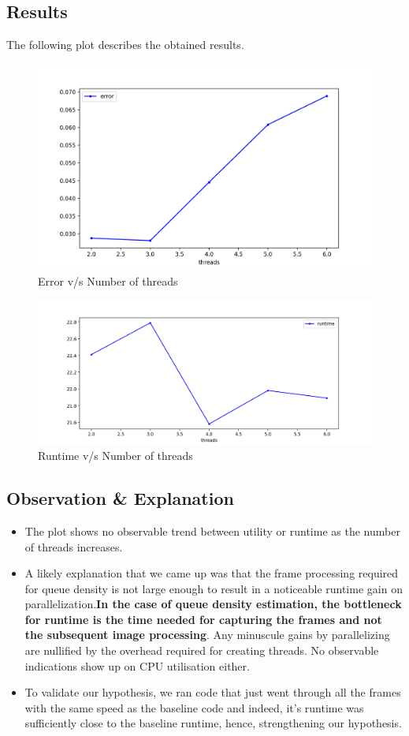 \documentclass[a4paper]{article}
\begin{document}
\subsection*{Results}
The following plot describes the obtained results.
\begin{figure}[h!]
    \centering
    \includegraphics[width=0.5\linewidth]{spatial-thread-error.png}
    \caption{Error v/s Number of threads}
    \label{fig:spatial-thread-error.png}
\end{figure}
\begin{figure}[H]
    \centering
    \includegraphics[width=0.5\linewidth]{spatial-thread-runtime.png}
    \caption{Runtime v/s Number of threads}
    \label{fig:spatial-thread-runtime.png}
\end{figure}
\subsection*{Observation \& Explanation}
\begin{itemize}
    \item The plot shows no observable trend between utility or runtime as the number of threads increases. \item A likely explanation that we came up was that the frame processing required for queue density is not large enough to result in a noticeable runtime gain on parallelization.\textbf{In the case of queue density estimation, the bottleneck for runtime is the time needed for capturing the frames and not the subsequent image processing}. Any minuscule gains by parallelizing are nullified by the overhead required for creating threads. No observable indications show up on CPU utilisation either.
    \item To validate our hypothesis, we ran code that just went through all the frames with the same speed as the baseline code and indeed, it's runtime was sufficiently close to the baseline runtime, hence, strengthening our hypothesis.
\end{itemize}
\end{document}
